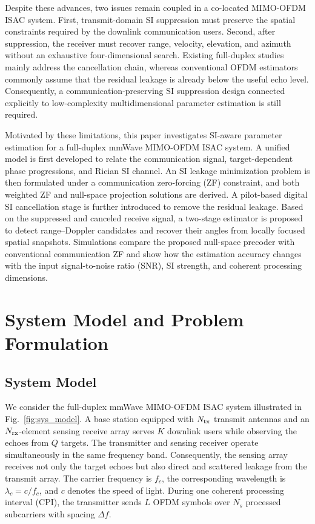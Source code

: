 \documentclass[conference]{IEEEtran}
\begin{document}
Despite these advances, two issues remain coupled in a co-located MIMO-OFDM ISAC system. First, transmit-domain SI suppression must preserve the spatial constraints required by the downlink communication users. Second, after suppression, the receiver must recover range, velocity, elevation, and azimuth without an exhaustive four-dimensional search. Existing full-duplex studies mainly address the cancellation chain, whereas conventional OFDM estimators commonly assume that the residual leakage is already below the useful echo level. Consequently, a communication-preserving SI suppression design connected explicitly to low-complexity multidimensional parameter estimation is still required.

Motivated by these limitations, this paper investigates SI-aware parameter estimation for a full-duplex mmWave MIMO-OFDM ISAC system. A unified model is first developed to relate the communication signal, target-dependent phase progressions, and Rician SI channel. An SI leakage minimization problem is then formulated under a communication zero-forcing (ZF) constraint, and both weighted ZF and null-space projection solutions are derived. A pilot-based digital SI cancellation stage is further introduced to remove the residual leakage. Based on the suppressed and canceled receive signal, a two-stage estimator is proposed to detect range--Doppler candidates and recover their angles from locally focused spatial snapshots. Simulations compare the proposed null-space precoder with conventional communication ZF and show how the estimation accuracy changes with the input signal-to-noise ratio (SNR), SI strength, and coherent processing dimensions.

\section{System Model and Problem Formulation}\label{sec:system_model}
\subsection{System Model}
We consider the full-duplex mmWave MIMO-OFDM ISAC system illustrated in Fig.~\ref{fig:sys_model}. A base station equipped with $N_{\rm tx}$ transmit antennas and an $N_{\rm rx}$-element sensing receive array serves $K$ downlink users while observing the echoes from $Q$ targets. The transmitter and sensing receiver operate simultaneously in the same frequency band. Consequently, the sensing array receives not only the target echoes but also direct and scattered leakage from the transmit array. The carrier frequency is $f_c$, the corresponding wavelength is $\lambda_c=c/f_c$, and $c$ denotes the speed of light. During one coherent processing interval (CPI), the transmitter sends $L$ OFDM symbols over $N_s$ processed subcarriers with spacing $\Delta f$.
\end{document}
